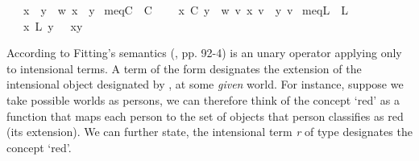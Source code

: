 \begin{isabellebody}
\isanewline
\ \ \ {\isachardoublequoteopen}x\ \isactrlbold {\isasymapprox}\ y\ {\isasymequiv}\ {\isasymlambda}w{\isachardot}\ x\ {\isacharequal}\ y{\isachardoublequoteclose}\isanewline
{}\isamarkupfalse%
\ meqC{\isacharcolon}{\isacharcolon}\ {\isachardoublequoteopen}{\isasymup}{\isasymlangle}{\isasymup}{\isasymzero}{\isacharcomma}{\isasymup}{\isasymzero}{\isasymrangle}{\isachardoublequoteclose}\ {\isacharparenleft}\isactrlbold {\isasymapprox}\isactrlsup C{\isachardoublequoteclose}{}{}{\isacharparenright}\ %
\isanewline
\ \ \ {\isachardoublequoteopen}x\ \isactrlbold {\isasymapprox}\isactrlsup C\ y\ {\isasymequiv}\ {\isasymlambda}w{\isachardot}\ {\isasymforall}v{\isachardot}\ {\isacharparenleft}x\ v{\isacharparenright}\ {\isacharequal}\ {\isacharparenleft}y\ v{\isacharparenright}{\isachardoublequoteclose}\isanewline
{}\isamarkupfalse%
\ meqL{\isacharcolon}{\isacharcolon}\ {\isachardoublequoteopen}{\isasymup}{\isasymlangle}{\isasymzero}{\isacharcomma}{\isasymzero}{\isasymrangle}{\isachardoublequoteclose}\ {\isacharparenleft}\isactrlbold {\isasymapprox}\isactrlsup L{\isachardoublequoteclose}{}{}{\isacharparenright}\ %
\isanewline
\ \ \ {\isachardoublequoteopen}x\ \isactrlbold {\isasymapprox}\isactrlsup L\ y\ {\isasymequiv}\ \isactrlbold {\isasymforall}{\isasymphi}{\isachardot}\ {\isasymphi}{\isacharparenleft}x{\isacharparenright}\isactrlbold {\isasymrightarrow}{\isasymphi}{\isacharparenleft}y{\isacharparenright}{\isachardoublequoteclose}%
\isamarkuptrue%
%
\begin{isamarkuptext}%
According to Fitting's semantics (\cite{Fitting}, pp. 92-4) \isa{{\isasymdown}} is an unary operator applying only to 
 intensional terms. A term of the form \isa{{\isasymdown}{\isasymalpha}} designates the extension of the intensional object designated by 
 \isa{{\isasymalpha}}, at some \emph{given} world. For instance, suppose we take possible worlds as persons,
 we can therefore think of the concept `red' as a function that maps each person to the set of objects that person
 classifies as red (its extension). We can further state, the intensional term \emph{r} of type \isa{{\isasymup}{\isasymlangle}{\isasymzero}{\isasymrangle}} designates the concept `red'.

\end{isamarkuptext}
\end{isabellebody}
